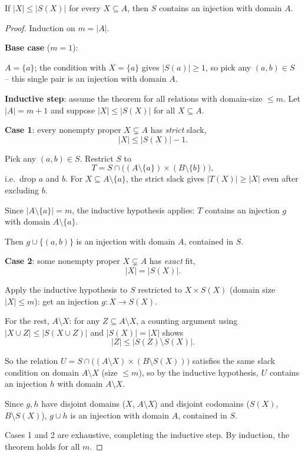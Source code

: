 \bigskip
\begin{theorem}
If $|X| \le |S(X)|$ for every $X \subseteq A$, then $S$ contains an injection with domain $A$.
\end{theorem}
\begin{proof}
Induction on $m=|A|$.

\medskip
\textbf{Base case} ($m=1$):

$A=\{a\}$; the condition with $X=\{a\}$ gives $|S(a)|\ge1$, so pick any $(a,b)\in S$ -- this single pair is an injection with domain $A$.

\medskip
\textbf{Inductive step}: assume the theorem for all relations with domain-size $\le m$. Let $|A|=m+1$ and suppose $|X|\le|S(X)|$ for all $X\subseteq A$.

\medskip
\textbf{Case 1}: every nonempty proper $X\subsetneq A$ has \emph{strict} slack,
\[
|X| \le |S(X)|-1.
\]

Pick any $(a,b)\in S$. Restrict $S$ to
\[
T = S \cap \big((A\setminus\{a\})\times(B\setminus\{b\})\big),
\]
i.e.\ drop $a$ and $b$. For $X\subseteq A\setminus\{a\}$, the strict slack gives $|T(X)|\ge|X|$ even after excluding $b$.

Since $|A\setminus\{a\}|=m$, the inductive hypothesis applies: $T$ contains an injection $g$ with domain $A\setminus\{a\}$.

Then $g \cup \{(a,b)\}$ is an injection with domain $A$, contained in $S$.

\medskip
\textbf{Case 2}: some nonempty proper $X\subsetneq A$ has \emph{exact} fit,
\[
|X|=|S(X)|.
\]

Apply the inductive hypothesis to $S$ restricted to $X\times S(X)$ (domain size $|X|\le m$): get an injection $g: X \to S(X)$.

For the rest, $A\setminus X$: for any $Z\subseteq A\setminus X$, a counting argument using $|X\cup Z|\le|S(X\cup Z)|$ and $|S(X)|=|X|$ shows
\[
|Z| \le |S(Z)\setminus S(X)|.
\]

So the relation $U = S \cap \big((A\setminus X)\times(B\setminus S(X))\big)$ satisfies the same slack condition on domain $A\setminus X$ (size $\le m$), so by the inductive hypothesis, $U$ contains an injection $h$ with domain $A\setminus X$.

Since $g,h$ have disjoint domains ($X$, $A\setminus X$) and disjoint codomains ($S(X)$, $B\setminus S(X)$), $g\cup h$ is an injection with domain $A$, contained in $S$.

\medskip
Cases 1 and 2 are exhaustive, completing the inductive step. By induction, the theorem holds for all $m$.
\end{proof}

